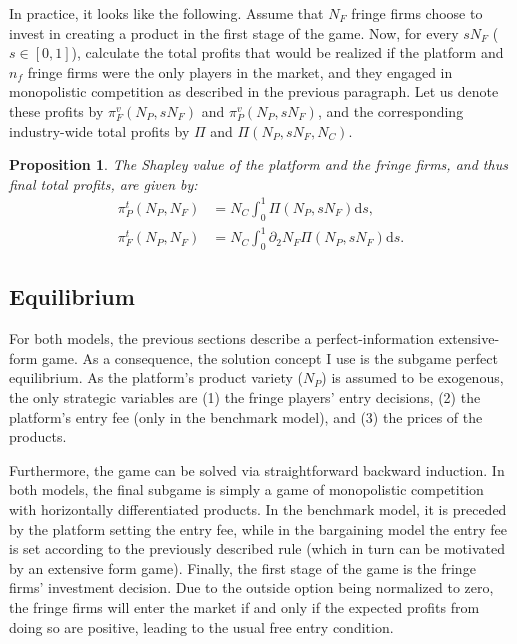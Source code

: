 \documentclass[a4paper]{article}
\newtheorem{proposition}{Proposition}
\newcommand{\ds}{\mathrm{d}s}
\begin{document}
In practice, it looks like the following.
Assume that $N_F$ fringe firms choose to invest in creating a product in the first stage of the game.
Now, for every $s N_F$ ($s \in [0, 1]$), calculate the total profits that would be realized if the platform and $n_f$ fringe firms were the only players in the market, and they engaged in monopolistic competition as described in the previous paragraph.
Let us denote these profits by $\pi^v_{F}(N_P,s N_F)$ and $\pi^v_{P}(N_P,s N_F)$, and the corresponding industry-wide total profits by $\Pi$ and $\Pi(N_P,s N_F, N_C)$.

\begin{proposition}
    \label{prop:shapley_value}
    The Shapley value of the platform and the fringe firms, and thus final total profits, are given by:
    \begin{align*}
        \pi^t_P(N_P, N_F) &= N_C \int_0^1 \Pi(N_P,s N_F) \ds, \\
        \pi^t_F(N_P, N_F) &= N_C \int_0^1 \partial_2 N_F \Pi(N_P,s N_F) \ds.
    \end{align*}
\end{proposition}


\subsection{Equilibrium}

For both models, the previous sections describe a perfect-information extensive-form game.
As a consequence, the solution concept I use is the subgame perfect equilibrium.
As the platform's product variety ($N_P$) is assumed to be exogenous, the only strategic variables are (1) the fringe players' entry decisions, (2) the platform's entry fee (only in the benchmark model), and (3) the prices of the products.

Furthermore, the game can be solved via straightforward backward induction.
In both models, the final subgame is simply a game of monopolistic competition with horizontally differentiated products.
In the benchmark model, it is preceded by the platform setting the entry fee, while in the bargaining model the entry fee is set according to the previously described rule (which in turn can be motivated by an extensive form game).
Finally, the first stage of the game is the fringe firms' investment decision.
Due to the outside option being normalized to zero, the fringe firms will enter the market if and only if the expected profits from doing so are positive, leading to the usual free entry condition.
\end{document}
